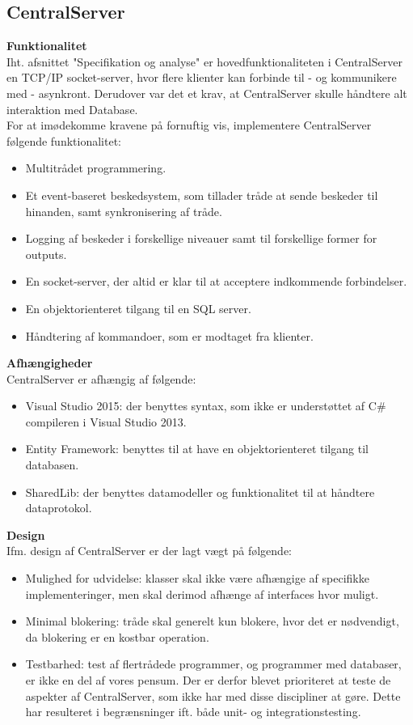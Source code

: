 \subsection{CentralServer}

\textbf{Funktionalitet}\\
Iht. afsnittet "Specifikation og analyse" er hovedfunktionaliteten i CentralServer en TCP/IP socket-server, hvor flere klienter kan forbinde til - og kommunikere med - asynkront. Derudover var det et krav, at CentralServer skulle håndtere alt interaktion med Database.\\

For at imødekomme kravene på fornuftig vis, implementere CentralServer følgende funktionalitet:

\begin{itemize}
	\item Multitrådet programmering.
	\item Et event-baseret beskedsystem, som tillader tråde at sende beskeder til hinanden, samt synkronisering af tråde.
	\item Logging af beskeder i forskellige niveauer samt til forskellige former for outputs.
	\item En socket-server, der altid er klar til at acceptere indkommende forbindelser.
	\item En objektorienteret tilgang til en SQL server.
	\item Håndtering af kommandoer, som er modtaget fra klienter.
\end{itemize}


\textbf{Afhængigheder}\\
CentralServer er afhængig af følgende:

\begin{itemize}
	\item Visual Studio 2015: der benyttes syntax, som ikke er understøttet af C\# compileren i Visual Studio 2013.
	\item Entity Framework: benyttes til at have en objektorienteret tilgang til databasen.
	\item SharedLib: der benyttes datamodeller og funktionalitet til at håndtere dataprotokol.
\end{itemize}


\textbf{Design}\\
Ifm. design af CentralServer er der lagt vægt på følgende:

\begin{itemize}
	\item Mulighed for udvidelse: klasser skal ikke være afhængige af specifikke implementeringer, men skal derimod afhænge af interfaces hvor muligt.
	\item Minimal blokering: tråde skal generelt kun blokere, hvor det er nødvendigt, da blokering er en kostbar operation.
	\item Testbarhed: test af flertrådede programmer, og programmer med databaser, er ikke en del af vores pensum. Der er derfor blevet prioriteret at teste de aspekter af CentralServer, som ikke har med disse discipliner at gøre. Dette har resulteret i begrænsninger ift. både unit- og integrationstesting.
\end{itemize}

